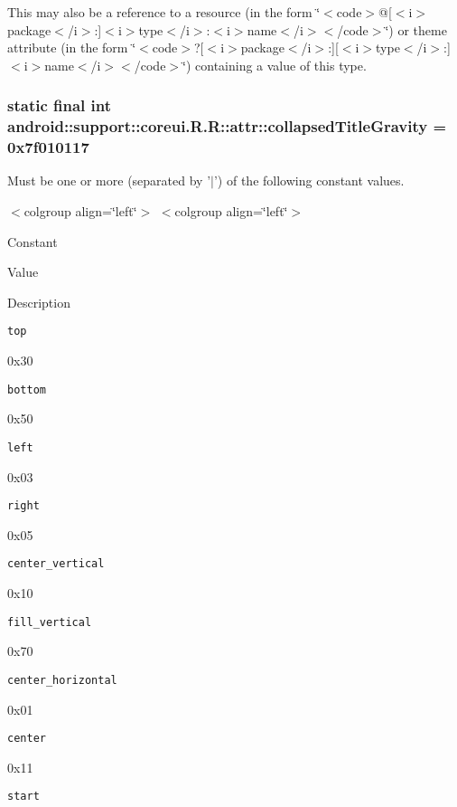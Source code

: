 This may also be a reference to a resource (in the form \char`\"{}$<$code$>$@\mbox{[}$<$i$>$package$<$/i$>$:\mbox{]}$<$i$>$type$<$/i$>$:$<$i$>$name$<$/i$>$$<$/code$>$\char`\"{}) or theme attribute (in the form \char`\"{}$<$code$>$?\mbox{[}$<$i$>$package$<$/i$>$:\mbox{]}\mbox{[}$<$i$>$type$<$/i$>$:\mbox{]}$<$i$>$name$<$/i$>$$<$/code$>$\char`\"{}) containing a value of this type. \hypertarget{classandroid_1_1support_1_1coreui_1_1_r_1_1attr_8d596c73979e9bc894c4ffd21caf2524}{
\subsubsection[{collapsedTitleGravity}]{\setlength{\rightskip}{0pt plus 5cm}static final int android::support::coreui.R.R::attr::collapsedTitleGravity = 0x7f010117}}
\label{classandroid_1_1support_1_1coreui_1_1_r_1_1attr_8d596c73979e9bc894c4ffd21caf2524}


Must be one or more (separated by '$|$') of the following constant values. \begin{TabularC}{0}
\hline
\end{TabularC}
$<$colgroup align=\char`\"{}left\char`\"{}$>$ $<$colgroup align=\char`\"{}left\char`\"{}$>$ 

Constant

Value

Description 

{\tt top}

0x30

{\tt bottom}

0x50

{\tt left}

0x03

{\tt right}

0x05

{\tt center\_\-vertical}

0x10

{\tt fill\_\-vertical}

0x70

{\tt center\_\-horizontal}

0x01

{\tt center}

0x11

{\tt start}

